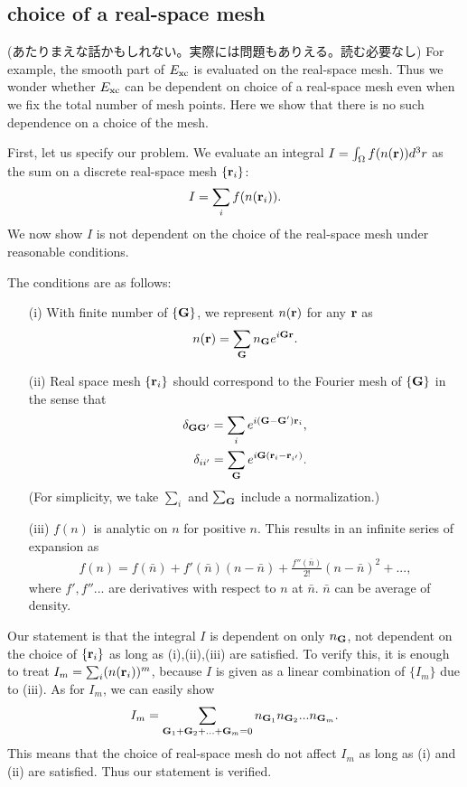 \documentclass[twocolumn,showpacs,preprintnumbers,amsmath,amssymb,floatfix]{revtex4-1}
\newcommand{\bfr}{{\bf r}}
\newcommand{\bfG}{{\bf G}}
\begin{document}
\subsection{choice of a real-space mesh}
\label{sec:realmesh}
(あたりまえな話かもしれない。実際には問題もありえる。読む必要なし)
For example, the smooth part of $E_{\rm xc}$ is evaluated on
the real-space mesh. Thus we wonder whether $E_{\rm xc}$ can be
dependent on choice of a real-space mesh even when we fix the total
number of mesh points. Here we show that there is no 
such dependence on a choice of the mesh.

First, let us specify our problem. We evaluate an integral 
$I=\int_\Omega f(n(\bfr)) d^3r$ as the sum on a discrete real-space mesh 
$\{\bfr_i\}$:
\begin{eqnarray}
I= \sum_{i} f(n(\bfr_{i})). \label{isum}
\end{eqnarray}
We now show $I$ is not dependent on the choice of the real-space mesh
under reasonable conditions.

The conditions are as follows:
\begin{itemize}
\item[(i)]
With finite number of $\{\bfG\}$, we represent $n(\bfr)$ for any $\bfr$ as
\begin{eqnarray}
n(\bfr)= \sum_{\bfG} n_\bfG e^{i \bfG \bfr}.
\end{eqnarray}
\item[(ii)]
Real space mesh $\{\bfr_{i}\}$ should correspond to the Fourier mesh of
$\{\bfG\}$ in the sense that
\begin{eqnarray}
\delta_{\bfG\bfG'}= \sum_{i} e^{i (\bfG-\bfG') \bfr_{i}},\nonumber \\
\delta_{ii'}= \sum_{\bfG} e^{i \bfG(\bfr_i-\bfr_{i'})}.
\end{eqnarray}
(For simplicity, we take $\sum_i$ and $\sum_\bfG$ include a normalization.)
\item[(iii)]
$f(n)$ is analytic on $n$ for positive $n$. This results in
	   an infinite series of expansion as 
\begin{eqnarray}
f(n)\!=\! f(\bar{n}) 
\!+\! f'(\bar{n}) (n-\bar{n}) \!+\! \frac{f''(\bar{n}) }{2!} (n-\bar{n})^2 \!+\!... , \label{fexpand}
\end{eqnarray}
where $f',f''...$ are derivatives with respect to $n$ at $\bar{n}$.
$\bar{n}$ can be average of density.
\end{itemize}

Our statement is that the integral $I$ is dependent on only $n_\bfG$, not
dependent on the choice of $\{\bfr_i\}$ as long as (i),(ii),(iii) are
satisfied. To verify this, it is enough to treat 
$I_m=\sum_i (n(\bfr_i))^m$, because
$I$ is given as a linear combination of $\{I_m\}$
due to (iii). As for $I_m$, we can easily show
\begin{eqnarray}
I_m = \sum_{\bfG_1+\bfG_2+...+\bfG_m=0} n_{\bfG_1} n_{\bfG_2} ... n_{\bfG_m}.
\end{eqnarray}
This means that the choice of real-space mesh do not affect $I_m$
as long as (i) and (ii) are satisfied. Thus our statement is verified.
\end{document}
